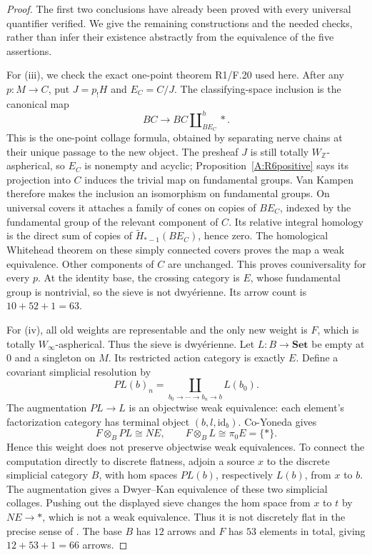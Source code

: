 \documentclass[11pt,a4paper]{article}
\theoremstyle{definition}
\theoremstyle{remark}
\newcommand{\Set}{\mathbf{Set}}
\newcommand{\id}{\mathrm{id}}
\newcommand{\Winfty}{W_\infty}
\newcommand{\WZ}{W_{\mathbb Z}}
\begin{document}
\begin{proof}
The first two conclusions have already been proved with every universal quantifier verified. We give the remaining constructions and the needed checks, rather than infer their existence abstractly from the equivalence of the five assertions.

For (iii), we check the exact one-point theorem R1/F.20 used here. After any $p:M\to C$, put $J=p_!H$ and $E_C=C/J$. The classifying-space inclusion is the canonical map
\[
 BC\longrightarrow BC\amalg^h_{BE_C}*.
\]
This is the one-point collage formula, obtained by separating nerve chains at their unique passage to the new object. The presheaf $J$ is still totally $\WZ$-aspherical, so $E_C$ is nonempty and acyclic; Proposition~\ref{A:R6positive} says its projection into $C$ induces the trivial map on fundamental groups. Van Kampen therefore makes the inclusion an isomorphism on fundamental groups. On universal covers it attaches a family of cones on copies of $BE_C$, indexed by the fundamental group of the relevant component of $C$. Its relative integral homology is the direct sum of copies of $\widetilde H_{*-1}(BE_C)$, hence zero. The homological Whitehead theorem on these simply connected covers proves the map a weak equivalence. Other components of $C$ are unchanged. This proves couniversality for every $p$. At the identity base, the crossing category is $E$, whose fundamental group is nontrivial, so the sieve is not dwy\'erienne. Its arrow count is $10+52+1=63$.

For (iv), all old weights are representable and the only new weight is $F$, which is totally $\Winfty$-aspherical. Thus the sieve is dwy\'erienne. Let $L:B\to\Set$ be empty at $0$ and a singleton on $M$. Its restricted action category is exactly $E$. Define a covariant simplicial resolution by
\[
 PL(b)_n=\coprod_{b_0\to\cdots\to b_n\to b}L(b_0).
\]
The augmentation $PL\to L$ is an objectwise weak equivalence: each element's factorization category has terminal object $(b,l,\id_b)$. Co-Yoneda gives
\[
 F\otimes_B PL\cong NE,\qquad F\otimes_B L\cong\pi_0 E=\{*\}.
\]
Hence this weight does not preserve objectwise weak equivalences. To connect the computation directly to discrete flatness, adjoin a source $x$ to the discrete simplicial category $B$, with hom spaces $PL(b)$, respectively $L(b)$, from $x$ to $b$. The augmentation gives a Dwyer--Kan equivalence of these two simplicial collages. Pushing out the displayed sieve changes the hom space from $x$ to $t$ by $NE\to*$, which is not a weak equivalence. Thus it is not discretely flat in the precise sense of \citet[Definition 3.4]{HORR2024}. The base $B$ has $12$ arrows and $F$ has $53$ elements in total, giving $12+53+1=66$ arrows.


\end{proof}
\end{document}
